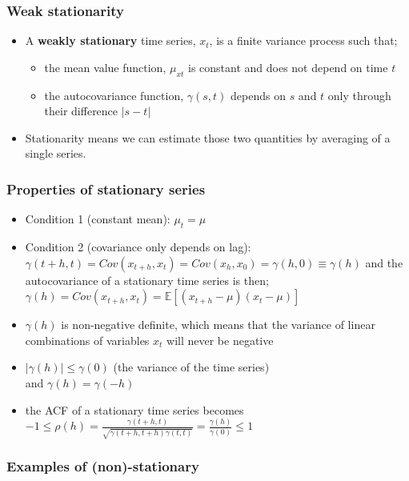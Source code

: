\documentclass{article}
\begin{document}
\subsubsection{Weak stationarity}
\begin{itemize}
    \item A \textbf{weakly stationary} time series, $x_t$, is a finite variance process such that;
    \begin{itemize}
        \item the mean value function, $\mu_{xt}$  is constant and does not depend on time $t$
        \item the autocovariance function, $\gamma(s,t)$ depends on $s$ and $t$ only through their difference $|s - t|$
    \end{itemize}
    \item Stationarity means we can estimate those two quantities by averaging of a single series.
\end{itemize}

\subsubsection{Properties of stationary series}

\begin{itemize}
    \item Condition 1 (constant mean): $\mu_t = \mu$
    \item Condition 2 (covariance only depends on lag):\\
    $\gamma(t+h,t) = Cov(x_{t+h},x_t) = Cov(x_h,x_0) = \gamma(h,0) \equiv \gamma(h)$
    \subitem and the autocovariance of a stationary time series is then; \\
    $\gamma(h) = Cov(x_{t+h}, x_t) = \mathbb{E}[(x_{t+h} - \mu)(x_t - \mu)]$
    \item $\gamma(h)$ is non-negative definite, which means that the variance of linear combinations of variables $x_t$ will never be negative
    \item $|\gamma(h)| \leq \gamma(0)$ (the variance of the time series)\\
    and $\gamma(h) = \gamma(-h)$
    \item the ACF of a stationary time series becomes\\
    $-1 \leq \rho(h) = \frac{\gamma(t+h,t)}{\sqrt{\gamma(t+h,t+h)\gamma(t,t)}} = \frac{\gamma(h)}{\gamma(0)} \leq 1$
\end{itemize}

\subsubsection{Examples of (non)-stationary}
\end{document}
